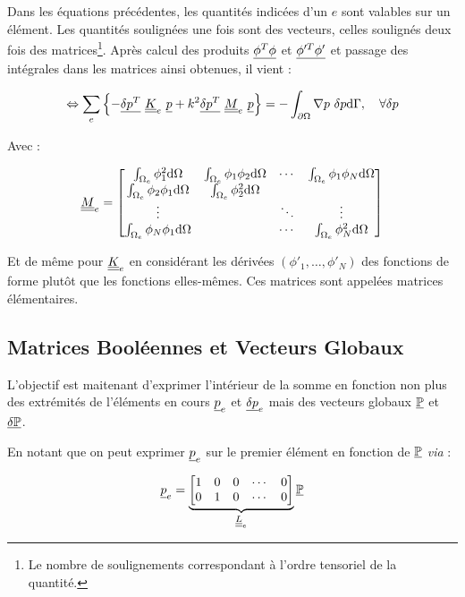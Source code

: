 Dans les équations précédentes, les quantités indicées d'un $e$ sont valables sur un élément. Les quantités soulignées
une fois sont des vecteurs, celles soulignés deux fois des matrices\footnote{Le nombre de soulignements correspondant à
l'ordre tensoriel de la quantité.}.
Après calcul des produits $\underline{\phi^T\phi}$ et $\underline{\phi'^T\phi'}$ et passage des intégrales dans les matrices ainsi
obtenues, il vient :

\begin{equation}
	\Leftrightarrow \sum_e\left\{- \underline{\delta p^T}~\underline{\underline{K}}_e~\underline{p} + k^2 \underline{\delta p^T}~\underline{\underline{M}}_e~\underline{p} \right\} = -\int_{\partial\Omega}\nabla p~\delta p\mathrm{d}\Gamma, \quad \forall\delta p\label{FEM1D:elem_mat}\\
\end{equation}

Avec :

\begin{equation*}
	\underline{\underline{M}}_e = \begin{bmatrix}
		\int_{\Omega_e}\phi_1^2\mathrm{d}\Omega & \int_{\Omega_e}\phi_1\phi_2\mathrm{d}\Omega & \cdots  &\int_{\Omega_e}\phi_1\phi_N\mathrm{d}\Omega\\
		\int_{\Omega_e}\phi_2\phi_1\mathrm{d}\Omega & \int_{\Omega_e}\phi_2^2\mathrm{d}\Omega & &\\
		\vdots & & \ddots & \vdots\\
		\int_{\Omega_e}\phi_N\phi_1\mathrm{d}\Omega & & \cdots & \int_{\Omega_e}\phi_N^2\mathrm{d}\Omega
	\end{bmatrix}
\end{equation*}

Et de même pour $\underline{\underline{K}}_e$ en considérant les dérivées $(\phi'_1,\ldots,\phi'_N)$ des fonctions de forme plutôt que les
fonctions elles-mêmes. Ces matrices sont appelées matrices élémentaires.

\subsection{Matrices Booléennes et Vecteurs Globaux}
\newcommand{\GP}{\ul{\mathbb{P}}}
\newcommand{\GDP}{\ul{\delta\mathbb{P}}}
L'objectif est maitenant d'exprimer l'intérieur de la somme en fonction non plus des extrémités de l'éléments en cours
$\underline{p}_e$ et $\underline{\delta p}_e$ mais des vecteurs globaux $\GP$ et $\GDP$.

En notant que on peut exprimer $\underline{p}_e$ sur le premier élément en fonction de $\GP$ \textit{via} :

\begin{equation*}
    \ul{p}_e =
    \underbrace{\begin{bmatrix}
         1 & 0 & 0 & \cdots & 0\\
         0 & 1 & 0 & \cdots & 0
    \end{bmatrix}}_{\uul{L}_e}\GP
\end{equation*}

